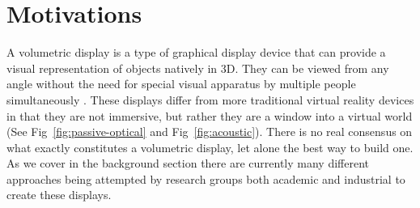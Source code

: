 \section{Motivations}
A volumetric display is a type of graphical display device that can provide a visual representation of objects natively in 3D. They can be viewed from any angle without the need for special visual apparatus by multiple people simultaneously \cite{1492264}. These displays differ from more traditional virtual reality devices in that they are not immersive, but rather they are a window into a virtual world (See Fig~\ref{fig:passive-optical} and Fig~\ref{fig:acoustic}). There is no real consensus on what exactly constitutes a volumetric display, let alone the best way to build one. As we cover in the background section there are currently many different approaches being attempted by research groups both academic and industrial to create these displays. 
 
